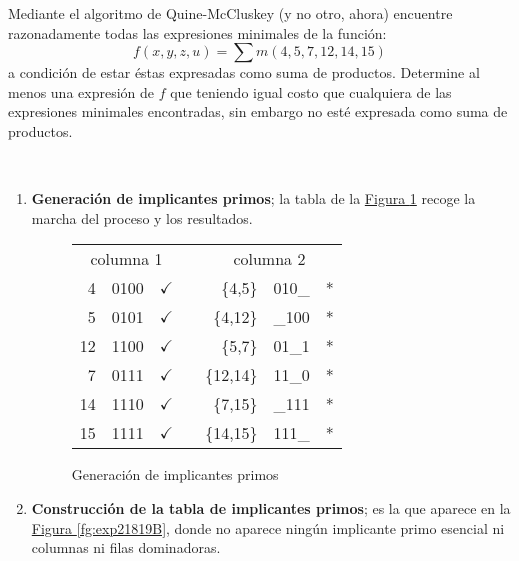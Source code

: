 \begin{exercise}
  Mediante el algoritmo de Quine-McCluskey (y no otro, ahora)
  encuentre razonadamente todas las expresiones minimales de la
  función:
  \begin{equation*}
    f(x,y,z,u)=\sum m(4,5,7,12,14,15)
  \end{equation*}
  a condición de estar éstas expresadas como suma de
  productos. Determine al menos una expresión de $f$ que teniendo igual 
  costo que cualquiera de las expresiones minimales encontradas, sin embargo
  no esté expresada como suma de productos.
\end{exercise}
  
  \begin{solution}~
    \begin{enumerate}
    \item \textbf{Generación de implicantes primos};  la tabla de la
    \hyperref[fg:exp21819A]{Figura \ref*{fg:exp21819A}} recoge la
    marcha del proceso y los resultados.
        \begin{figure}[!hbp]
          \centering
          \begin{tabular}[c]{rcccrcc}
            \multicolumn{3}{c}{columna 1}
            &
            &\multicolumn{3}{c}{columna 2}
            \\\cline{1-3}\cline{5-7}
            4&0100&$\checkmark$&&\{4,5\}&010{\_}&*\\\cline{1-3}
            5&0101&$\checkmark$&&\{4,12\}&{\_}100&*\\\cline{5-7}
            12&1100&$\checkmark$&&\{5,7\}&01{\_}1&*\\\cline{1-3}
            7&0111&$\checkmark$&&\{12,14\}&11{\_}0&*\\\cline{5-7}
            14&1110&$\checkmark$&&\{7,15\}&{\_}111&*\\\cline{1-3}
            15&1111&$\checkmark$&&\{14,15\}&111{\_}&*\\\cline{5-7}
          \end{tabular}
          \caption{\label{fg:exp21819A} Generación de implicantes primos}
        \end{figure}
      \item \textbf{Construcción de la tabla de implicantes primos};
        es la que aparece en la \hyperref[fg:exp21819B]{Figura
          \ref*{fg:exp21819B}}, donde no aparece ningún implicante
        primo esencial ni columnas ni filas dominadoras.
        \begin{figure}[!hbp]
          \centering
          \begin{tabular}[c]{crl|ccccccccc|}

\end{tabular}
\end{figure}
\end{enumerate}
\end{solution}
